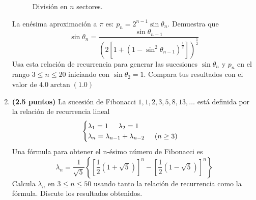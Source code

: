 \documentclass[11pt]{article}
\begin{document}
\begin{enumerate}
\begin{figure}[H]
\caption{Divisi\'{o}n en $n$ sectores.}
\end{figure}
La en\'{e}sima aproximaci\'{o}n a $\pi$ es: $p_{n}= 2^{n-1} \sin \theta_{n}$. Demuestra que
\[\sin \theta_{n} = \dfrac{\sin \theta_{n-1}}{\left( 2 \left[ 1+ (1-\sin^{2}\theta_{n-1})^{\frac{1}{2}} \right] \right)^{\frac{1}{2}}} \]
Usa esta relaci\'{o}n de recurrencia para generar las sucesiones $\sin \theta_{n}$ y $p_{n}$ en el rango $3 \leq n \leq 20$ iniciando con $\sin \theta_{2}=1$. Compara tus resultados con el valor de $4.0 \arctan(1.0)$
\item \textbf{(2.5 puntos) } La sucesi\'{o}n de Fibonacci $1,1,2,3,5,8,13,\ldots$ est\'{a} definida por la relaci\'{o}n de recurrencia lineal
\begin{equation*}
\begin{cases}
\lambda_{1} = 1 \hspace{0.5cm} \lambda_{2}= 1 \\
\lambda_{n} = \lambda_{n-1} + \lambda_{n-2} \hspace{0.5cm} (n \geq 3)
\end{cases}
\end{equation*}
Una f\'{o}rmula para obtener el n-\'{e}simo n\'{u}mero de Fibonacci es
\[ \lambda_{n} = \dfrac{1}{\sqrt{5}} \left\lbrace \left[ \dfrac{1}{2} (1 + \sqrt{5}) \right]^{n} - \left[ \dfrac{1}{2} (1 - \sqrt{5}) \right]^{n} \right\rbrace \]
Calcula $\lambda_{n}$ en $3\leq n \leq 50$ usando tanto la relaci\'{o}n de recurrencia como la f\'{o}rmula. Discute los resultados obtenidos.
\end{enumerate}
\end{document}
